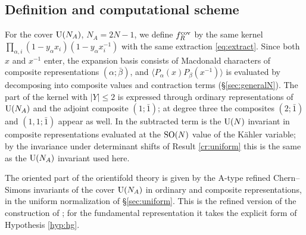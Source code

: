 \subsection{Definition and computational scheme}\label{sec:procedure}
For the cover $\mathrm{U}(N_A)$, $N_A = 2N-1$, we define $f^{\mathrm{cov}}_R$ by the same kernel $\prod_{\alpha,i}(1 - y_\alpha x_i)(1 - y_\alpha x_i^{-1})$ with the same extraction \eqref{eq:extract}. Since both $x$ and $x^{-1}$ enter, the expansion basis consists of Macdonald characters of composite representations $(\alpha; \bar\beta)$, and $\langle P_\alpha(x) P_\beta(x^{-1})\rangle$ is evaluated by decomposing into composite values and contraction terms (\S\ref{sec:generalN}). The part of the kernel with $|Y| \le 2$ is expressed through ordinary representations of $\mathrm{U}(N_A)$ and the adjoint composite $(1;\bar1)$; at degree three the composites $(2;\bar1)$ and $(1,1;\bar1)$ appear as well. In \cite{Marino09} the subtracted term is the $\mathrm{U}(N)$ invariant in composite representations evaluated at the $\mathrm{SO}(N)$ value of the K\"ahler variable; by the invariance under determinant shifts of Result \ref{cr:uniform} this is the same as the $\mathrm{U}(N_A)$ invariant used here.
\begin{hypothesis}\label{hyp:cover}
The oriented part of the orientifold theory is given by the A-type refined Chern--Simons invariants of the cover $\mathrm{U}(N_A)$ in ordinary and composite representations, in the uniform normalization of \S\ref{sec:uniform}. This is the refined version of the construction of \cite{Marino09}; for the fundamental representation it takes the explicit form of Hypothesis \ref{hyp:hg}.
\end{hypothesis}

